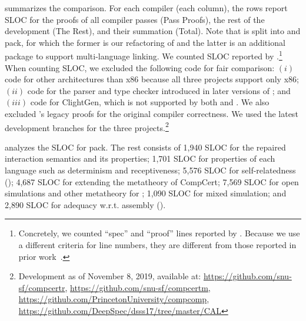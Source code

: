  summarizes the comparison.
For each compiler (\ie each column),
the rows report SLOC for the proofs of all compiler passes (Pass Proofs),
the rest of the development (The Rest),
and their summation (Total).
Note that \ccm{} is split into \ccr{} and \ccm{} pack, for which the former is our refactoring
of \cc{} and the latter is an additional package to support multi-language linking.
We counted SLOC reported by
.\footnote{Concretely, we counted ``spec'' and ``proof'' lines reported by .
  Because we use a different criteria for line numbers, they are different from those reported in
  prior work~\cite{stewart:ccc,gu:dscal,wang:saccx}.}  When counting SLOC, we excluded the following
code for fair comparison: $(i)$ code for other architectures than x86 because all three projects support
only x86; $(ii)$ code for the parser and type checker introduced in later versions of \cc{}; and $(iii)$ code for \textrm{ClightGen}, which is not supported by both \ccx{} and
\ccc{}.  We also excluded \ccc{}'s legacy proofs for the original compiler correctness.  We used the
latest development branches for the three projects.\footnote{Development as of November 8, 2019, available at: \url{https://github.com/snu-sf/compcertr}, \url{https://github.com/snu-sf/compcertm}, \url{https://github.com/PrincetonUniversity/compcomp}, \url{https://github.com/DeepSpec/dsss17/tree/master/CAL}}








 analyzes the  SLOC for \ccm{} pack.
The rest consists of
1,940 SLOC for the repaired interaction semantics and its properties;
1,701 SLOC for properties of each language such as determinism and receptiveness;
5,576 SLOC for self-relatedness ();
4,687 SLOC for extending the metatheory of CompCert;
7,569 SLOC for open simulations and other metatheory for \ccm{};
1,090 SLOC for mixed simulation; and
2,890 SLOC for adequacy w.r.t. assembly ().

